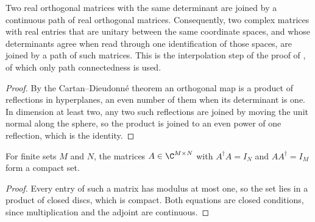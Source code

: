 \begin{lemma}
    \label{lem:mpu_orthogonal_gate_interpolation}
    \leanok
    Two real orthogonal matrices with the same determinant are joined by a
    continuous path of real orthogonal matrices. Consequently, two complex
    matrices with real entries that are unitary between the same coordinate
    spaces, and whose determinants agree when read through one
    identification of those spaces, are joined by a path of such matrices.
    This is the interpolation step of the proof of
    \cite[Theorem~\texttt{conjphs}]{Cirac2017MPU}, of which only path
    connectedness is used.
\end{lemma}

\begin{proof}
    \leanok
    By the Cartan--Dieudonn\'e theorem an orthogonal map is a product of
    reflections in hyperplanes, an even number of them when its determinant
    is one. In dimension at least two, any two such reflections are joined by
    moving the unit normal along the sphere, so the product is joined to an
    even power of one reflection, which is the identity.
\end{proof}

\begin{lemma}
    \label{lem:unitary_between_compact}
    \leanok
    For finite sets $M$ and $N$, the matrices $A\in\C^{M\times N}$ with
    $A^\dagger A=I_N$ and $AA^\dagger=I_M$ form a compact set.
\end{lemma}

\begin{proof}
    \leanok
    Every entry of such a matrix has modulus at most one, so the set lies in
    a product of closed discs, which is compact. Both equations are closed
    conditions, since multiplication and the adjoint are continuous.
\end{proof}

